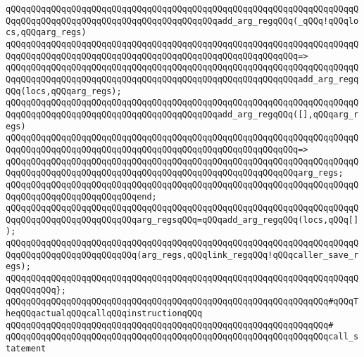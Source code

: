 \newline
\verb|qQQqqQQqqQQqqQQqqQQqqQQqqQQqqQQqqQQqqQQqqQQqqQQqqQQqqQQqqQQqqQQqqQQqqQQqqQQqqQQqqQQqqQQqqQQqqQQqqQQqqQQqqQQqqQQqadd_arg_regqQQq(_qQQq!qQQqlocs,qQQqarg_regs)|\newline
\verb|qQQqqQQqqQQqqQQqqQQqqQQqqQQqqQQqqQQqqQQqqQQqqQQqqQQqqQQqqQQqqQQqqQQqqQQqqQQqqQQqqQQqqQQqqQQqqQQqqQQqqQQqqQQqqQQqqQQqqQQqqQQqqQQq=>|\newline
\verb|qQQqqQQqqQQqqQQqqQQqqQQqqQQqqQQqqQQqqQQqqQQqqQQqqQQqqQQqqQQqqQQqqQQqqQQqqQQqqQQqqQQqqQQqqQQqqQQqqQQqqQQqqQQqqQQqqQQqqQQqqQQqqQQqadd_arg_regqQQq(locs,qQQqarg_regs);|\newline
\newline
\verb|qQQqqQQqqQQqqQQqqQQqqQQqqQQqqQQqqQQqqQQqqQQqqQQqqQQqqQQqqQQqqQQqqQQqqQQqqQQqqQQqqQQqqQQqqQQqqQQqqQQqqQQqqQQqqQQqadd_arg_regqQQq([],qQQqarg_regs)|\newline
\verb|qQQqqQQqqQQqqQQqqQQqqQQqqQQqqQQqqQQqqQQqqQQqqQQqqQQqqQQqqQQqqQQqqQQqqQQqqQQqqQQqqQQqqQQqqQQqqQQqqQQqqQQqqQQqqQQqqQQqqQQqqQQqqQQq=>|\newline
\verb|qQQqqQQqqQQqqQQqqQQqqQQqqQQqqQQqqQQqqQQqqQQqqQQqqQQqqQQqqQQqqQQqqQQqqQQqqQQqqQQqqQQqqQQqqQQqqQQqqQQqqQQqqQQqqQQqqQQqqQQqqQQqqQQqarg_regs;|\newline
\verb|qQQqqQQqqQQqqQQqqQQqqQQqqQQqqQQqqQQqqQQqqQQqqQQqqQQqqQQqqQQqqQQqqQQqqQQqqQQqqQQqqQQqqQQqqQQqqQQqend;|\newline
\newline
\verb|qQQqqQQqqQQqqQQqqQQqqQQqqQQqqQQqqQQqqQQqqQQqqQQqqQQqqQQqqQQqqQQqqQQqqQQqqQQqqQQqqQQqqQQqqQQqqQQqarg_regsqQQq=qQQqadd_arg_regqQQq(locs,qQQq[]);|\newline
\newline
\verb|qQQqqQQqqQQqqQQqqQQqqQQqqQQqqQQqqQQqqQQqqQQqqQQqqQQqqQQqqQQqqQQqqQQqqQQqqQQqqQQqqQQqqQQqqQQqqQQq(arg_regs,qQQqlink_regqQQq!qQQqcaller_save_regs);|\newline
\verb|qQQqqQQqqQQqqQQqqQQqqQQqqQQqqQQqqQQqqQQqqQQqqQQqqQQqqQQqqQQqqQQqqQQqqQQqqQQqqQQq};|\newline
\newline
\newline
\verb|qQQqqQQqqQQqqQQqqQQqqQQqqQQqqQQqqQQqqQQqqQQqqQQqqQQqqQQqqQQqqQQq#qQQqTheqQQqactualqQQqcallqQQqinstructionqQQq|\newline
\verb|qQQqqQQqqQQqqQQqqQQqqQQqqQQqqQQqqQQqqQQqqQQqqQQqqQQqqQQqqQQqqQQq#|\newline
\verb|qQQqqQQqqQQqqQQqqQQqqQQqqQQqqQQqqQQqqQQqqQQqqQQqqQQqqQQqqQQqqQQqcall_statement|\newline
